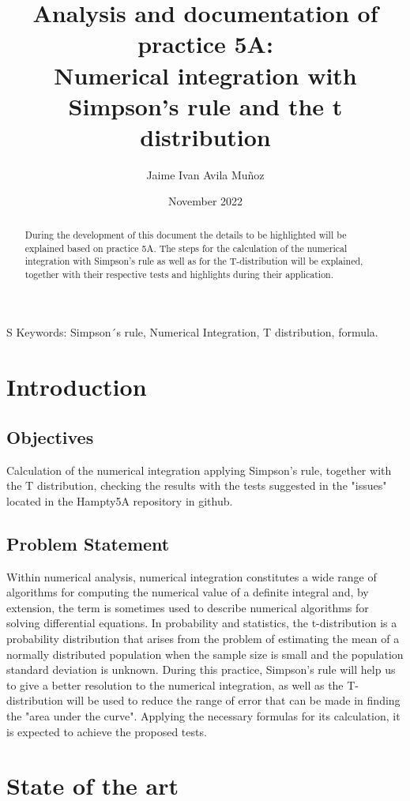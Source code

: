 \documentclass{article}
\title{Analysis and documentation of practice 5A:\\
Numerical integration with Simpson’s rule and the t distribution}
\author{Jaime Ivan Avila Muñoz}
\date{November 2022}
\begin{document}
\maketitle

\begin{abstract}
{During the development of this document the details to be highlighted will be explained based on practice 5A. The steps for the calculation of the numerical integration with Simpson's rule as well as for the T-distribution will be explained, together with their respective tests and highlights during their application.}

\end{abstract}
S
Keywords:
Simpson´s rule, Numerical Integration, T distribution, formula.

\section{Introduction}

\subsection{Objectives}
{Calculation of the numerical integration applying Simpson's rule, together with the T distribution, checking the results with the tests suggested in the "issues" located in the Hampty5A repository in github.}
\subsection{Problem Statement}
{Within numerical analysis, numerical integration constitutes a wide range of algorithms for computing the numerical value of a definite integral and, by extension, the term is sometimes used to describe numerical algorithms for solving differential equations. 
In probability and statistics, the t-distribution is a probability distribution that arises from the problem of estimating the mean of a normally distributed population when the sample size is small and the population standard deviation is unknown.
During this practice, Simpson's rule will help us to give a better resolution to the numerical integration, as well as the T-distribution will be used to reduce the range of error that can be made in finding the "area under the curve".
Applying the necessary formulas for its calculation, it is expected to achieve the proposed tests.}
\section{State of the art}
\end{document}
